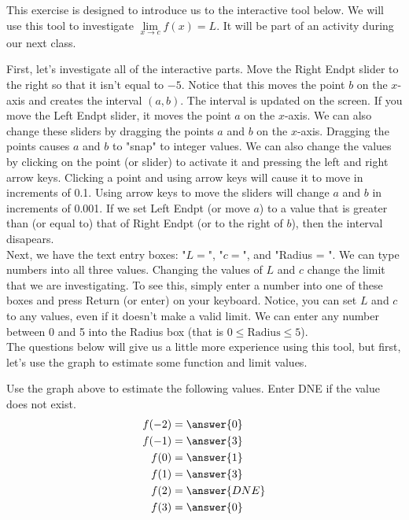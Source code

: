 \documentclass{ximera}
\author{Kevin James}
\begin{document}
   \begin{exercise}
   	This exercise is designed to introduce us to the interactive tool below.  We will use this tool to investigate $ \lim\limits_{x \to c}f(x)=L $.  It will be part of an activity during our next class.  
   	\begin{center}
   	   \begin{onlineOnly}
   	   \end{onlineOnly} 
   	\end{center}
   	
   	First, let's investigate all of the interactive parts.  Move the Right Endpt slider to the right so that it isn't equal to $-5$.  Notice that this moves the point $b$ on the $x$-axis and creates the interval $(a,b)$. The interval is updated on the screen.  If you move the Left Endpt slider, it moves the point $a$ on the $x$-axis.  We can also change these sliders by dragging the points $a$ and $b$ on the $x$-axis.  Dragging the points causes $a$ and $b$ to "snap" to integer values.  We can also change the values by clicking on the point (or slider) to activate it and pressing the left and right arrow keys.  Clicking a point and using arrow keys will cause it to move in increments of 0.1.  Using arrow keys to move the sliders will change $a$ and $b$ in increments of 0.001. If we set Left Endpt (or move $a$) to a value that is greater than (or equal to) that of Right Endpt (or to the right of $b$), then the interval disapears.\\
   	
   	Next, we have the text entry boxes: "$L = $", "$c=$", and "Radius = ".  We can type numbers into all three values.  Changing the values of $L$ and $c$ change the limit that we are investigating.  To see this, simply enter a number into one of these boxes and press Return (or enter) on your keyboard.  Notice, you can set $L$ and $c$ to any values, even if it doesn't make a valid limit.  We can enter any number between 0 and 5 into the Radius box (that is $ 0 \leq \text{Radius} \leq 5 $). \\
   	
   	The questions below will give us a little more experience using this tool, but first, let's use the graph to estimate some function and limit values.
   	
   	\begin{question} Use the graph above to estimate the following values.  Enter DNE if the value does not exist.
   		\begin{align*}
   			f(-2) &= \answer{0} \\
   			f(-1) &= \answer{3}  \\
   			f(0) &= \answer{1}  \\
   			f(1) &= \answer{3} \\
   			f(2) &= \answer{DNE} \\
   			f(3) &= \answer{0}
   		\end{align*}
   	\end{question}
   	

\end{exercise}
\end{document}
